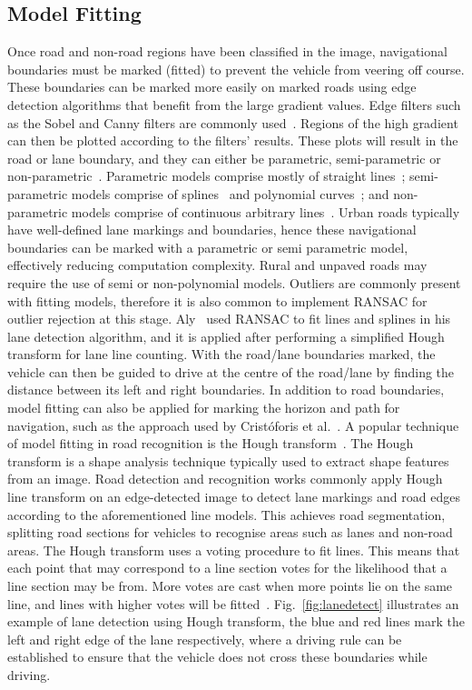 \subsection{Model Fitting} \label{secmodel}
Once road and non-road regions have been classified in the image, navigational boundaries must be marked (fitted) to prevent the vehicle from veering off course. These boundaries can be marked more easily on marked roads using edge detection algorithms that benefit from the large gradient values. Edge filters such as the Sobel and Canny filters are commonly used~\cite{min_component-model_2015, c._siagian_mobile_2013, r._chen_research_2013}. Regions of the high gradient can then be plotted according to the filters' results. These plots will result in the road or lane boundary, and they can either be parametric, semi-parametric or non-parametric~\cite{bar_hillel_recent_2014}. Parametric models comprise mostly of straight lines~\cite{h._kong_general_2010}; semi-parametric models comprise of splines~\cite{wang_lane_2000} and polynomial curves~\cite{z._tao_lane_2013,m._revilloud_improved_2013}; and non-parametric models comprise of continuous arbitrary lines~\cite{cristoforis_real-time_2016}. Urban roads typically have well-defined lane markings and boundaries, hence these navigational boundaries can be marked with a parametric or semi parametric model, effectively reducing computation complexity. Rural and unpaved roads may require the use of semi or non-polynomial models. Outliers are commonly present with fitting models, therefore it is also common to implement RANSAC for outlier rejection at this stage. Aly~\cite{m._aly_real_2008} used RANSAC to fit lines and splines in his lane detection algorithm, and it is applied after performing a simplified Hough transform for lane line counting. With the road/lane boundaries marked, the vehicle can then be guided to drive at the centre of the road/lane by finding the distance between its left and right boundaries. In addition to road boundaries, model fitting can also be applied for marking the horizon and path for navigation, such as the approach used by Crist\'{o}foris et al.~\cite{cristoforis_real-time_2016}. A popular technique of model fitting in road recognition is the Hough transform~\cite{richard_o._duda_use_1972}. The Hough transform is a shape analysis technique typically used to extract shape features from an image. Road detection and recognition works commonly apply Hough line transform on an edge-detected image to detect lane markings and road edges according to the aforementioned line models. This achieves road segmentation, splitting road sections for vehicles to recognise areas such as lanes and non-road areas. The Hough transform uses a voting procedure to fit lines. This means that each point that may correspond to a line section votes for the likelihood that a line section may be from. More votes are cast when more points lie on the same line, and lines with higher votes will be fitted~\cite{muhammad_opencv_2015}. Fig.~\ref{fig:lanedetect} illustrates an example of lane detection using Hough transform, the blue and red lines mark the left and right edge of the lane respectively, where a driving rule can be established to ensure that the vehicle does not cross these boundaries while driving. 